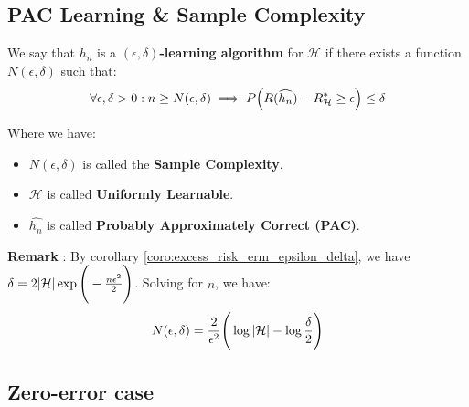 \subsection{PAC Learning \& Sample Complexity}
\begin{definition}
    We say that $\widehat{h_n}$ is a \textbf{$(\epsilon, \delta)$-learning algorithm} for $\mathcal{H}$ if there exists a function $N(\epsilon, \delta)$ such that: 
    \begin{align*}
        \forall \epsilon, \delta > 0 : n \ge N(\epsilon, \delta) \implies 
        P\Big( R(\widehat{h_n}) - R_\mathcal{H}^* \ge \epsilon \Big) \le \delta
    \end{align*}   

    \noindent Where we have:
    \begin{itemize}
        \item $N(\epsilon, \delta)$ is called the \textbf{Sample Complexity}.
        \item $\mathcal{H}$ is called \textbf{Uniformly Learnable}.
        \item $\widehat{h_n}$ is called \textbf{Probably Approximately Correct (PAC)}.
    \end{itemize}
\end{definition}
\textbf{Remark} : By corollary \ref{coro:excess_risk_erm_epsilon_delta}, we have $\delta = 2|\mathcal{H}|\exp\Bigg( -\frac{n\epsilon^2}{2} \Bigg)$. Solving for $n$, we have:
\begin{align*}
    N(\epsilon, \delta) = \frac{2}{\epsilon^2}\Bigg( 
        \log|\mathcal{H}| - \log\frac{\delta}{2}
     \Bigg)
\end{align*}



\subsection{Zero-error case}


